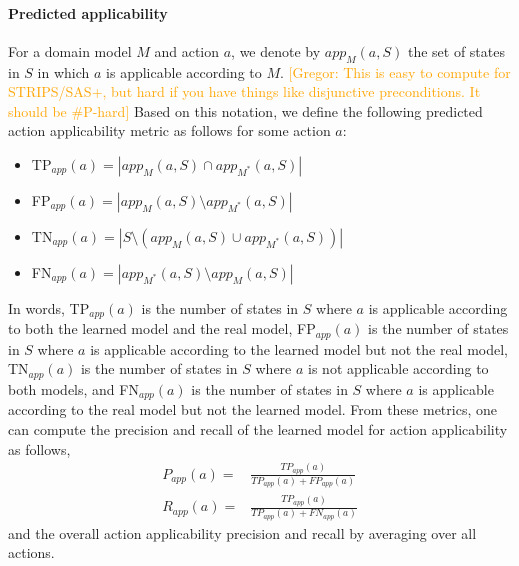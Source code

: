 \documentclass{article}
\theoremstyle{definition}
\theoremstyle{remark}
\newcommand{\realm}{\ensuremath{M^*}\xspace}
\newcommand{\app}{\ensuremath{\textit{app}}\xspace}
\newcommand{\gregor}[1]{{\textcolor{orange}{[Gregor: #1]}}}
\begin{document}
\paragraph{Predicted applicability}
For a domain model $M$ and action $a$, we denote by $\app_M(a,S)$ the set of states in $S$ in which $a$ is applicable according to $M$. \gregor{This is easy to compute for STRIPS/SAS+, but hard if you have things like disjunctive preconditions. It should be \#P-hard} Based on this notation, we define the following predicted action applicability metric as follows for some action $a$:
\begin{itemize}
    \item TP$_{\app}(a)=|\app_M(a,S)\cap \app_\realm(a,S)|$
    \item FP$_{\app}(a)=|\app_M(a,S)\setminus \app_\realm(a,S)|$ 
    \item TN$_{\app}(a)=|S\setminus (\app_M(a,S)\cup \app_\realm(a,S))|$
    \item FN$_{\app}(a)=|\app_\realm(a,S)\setminus \app_M(a,S)|$
\end{itemize}
In words, TP$_{\app}(a)$ is the number of states in $S$ where $a$ is applicable according to both the learned model and the real model, FP$_{\app}(a)$ is the number of states in $S$ where $a$ is applicable according to the learned model but not the real model, TN$_{\app}(a)$ is the number of states in $S$ where $a$ is not applicable according to both models, and FN$_{\app}(a)$ is the number of states in $S$ where $a$ is applicable according to the real model but not the learned model. 
From these metrics, one can compute the precision and recall of the learned model for action applicability as follows,
\begin{align}
    P_{\app}(a)= & \frac{TP_{\app}(a)}{TP_{\app}(a)+FP_{\app}(a)}\\
    R_{\app}(a)= & \frac{TP_{\app}(a)}{TP_{\app}(a)+FN_{\app}(a)}    
\end{align} 
and the overall action applicability precision and recall
by averaging over all actions.  
\end{document}
